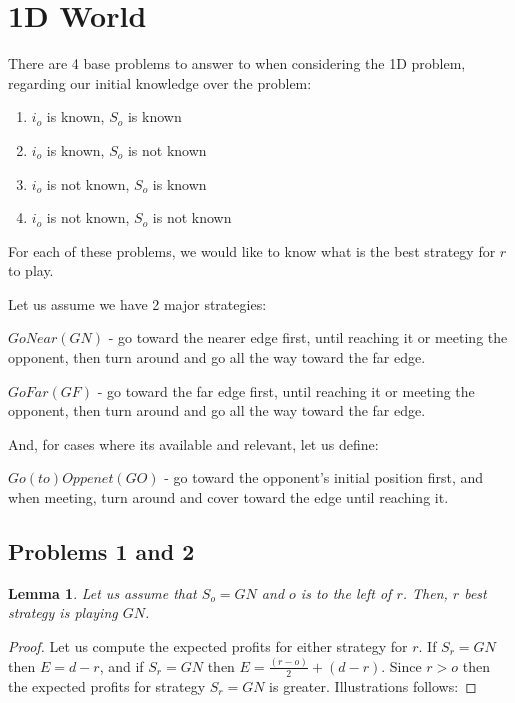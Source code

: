\documentclass[a4paper,10pt]{article}
\newtheorem{lemma}[theorem]{Lemma}
\newcommand\rob{\ensuremath{r}\xspace}
\newcommand\opp{\ensuremath{o}\xspace}
\newcommand{\gn}{\ensuremath{GN}\xspace}
\newcommand{\gf}{\ensuremath{GF}\xspace}
\newcommand{\go}{\ensuremath{GO}\xspace}
\begin{document}
\section{1D World}

There are 4 base problems to answer to when considering the 1D problem, regarding our initial knowledge over the problem:

\begin{enumerate}
\item $i_{\opp}$ is known, $S_{\opp}$ is known
\item $i_{\opp}$ is known, $S_{\opp}$ is not known
\item $i_{\opp}$ is not known, $S_{\opp}$ is known
\item $i_{\opp}$ is not known, $S_{\opp}$ is not known
\end{enumerate}

For each of these problems, we would like to know what is the best strategy for \rob to play.

Let us assume we have 2 major strategies:

$GoNear(\gn)$ - go toward the nearer edge first, until reaching it or meeting the opponent, then turn around and go all the way toward the far edge.

$GoFar(\gf)$ - go toward the far edge first, until reaching it or meeting the opponent, then turn around and go all the way toward the far edge.

And, for cases where its available and relevant, let us define:

$Go(to)Oppenet(\go)$ - go toward the opponent's initial position first, and when meeting, turn around and cover toward the edge until reaching it.

\subsection{Problems 1 and 2} \label{subsections: full and partial information, 1D world}
\begin{lemma}
Let us assume that $S_{\opp}=\gn$ and \opp is to the left of \rob. Then, \rob best strategy is playing \gn.
\end{lemma}
\begin{proof}
Let us compute the expected profits for either strategy for \rob.
If $S_{\rob}=\gn$ then $E=d-r$, and if $S_{\rob}=\gn$ then $E=\frac{(r-o)}{2} + (d-r)$. Since $r > o$ then the expected profits for strategy $S_{\rob}=\gn$ is greater. Illustrations follows:
\end{proof}
\end{document}

